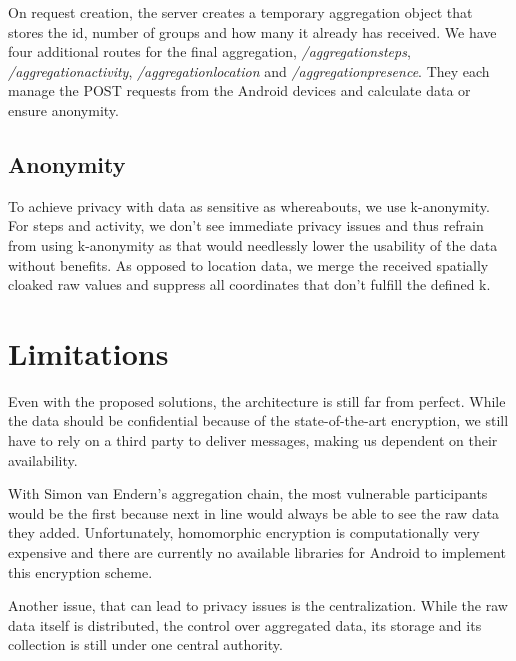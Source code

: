 On request creation, the server creates a temporary aggregation object that stores the id, number of groups and how many it already has received. We have four additional routes for the final aggregation, \textit{/aggregationsteps}, \textit{/aggregationactivity}, \textit{/aggregationlocation} and \textit{/aggregationpresence}. They each manage the POST requests from the Android devices and calculate data or ensure anonymity.

\subsection{Anonymity}

To achieve privacy with data as sensitive as whereabouts, we use k-anonymity. For steps and activity, we don't see immediate privacy issues and thus refrain from using k-anonymity as that would needlessly lower the usability of the data without benefits. As opposed to location data, we merge the received spatially cloaked raw values and suppress all coordinates that don't fulfill the defined k. 

\section{Limitations}
Even with the proposed solutions, the architecture is still far from perfect. While the data should be confidential because of the state-of-the-art encryption, we still have to rely on a third party to deliver messages, making us dependent on their availability.

With Simon van Endern's aggregation chain, the most vulnerable participants would be the first because next in line would always be able to see the raw data they added. Unfortunately, homomorphic encryption is computationally very expensive and there are currently no available libraries for Android to implement this encryption scheme.

Another issue, that can lead to privacy issues is the centralization. While the raw data itself is distributed, the control over aggregated data, its storage and its collection is still under one central authority.